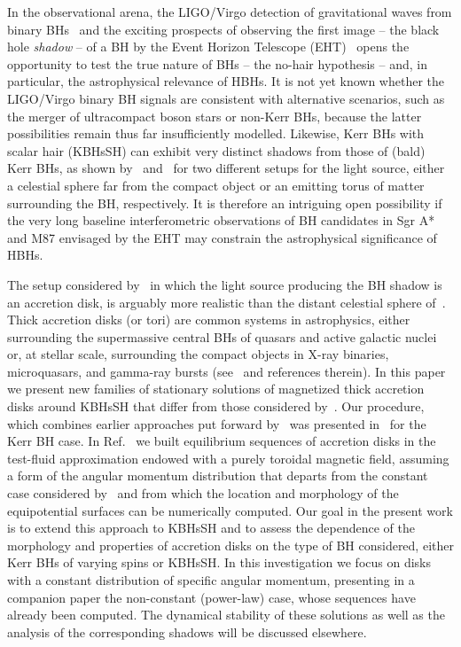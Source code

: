 \documentclass[twocolumn,aps,showpacs,showkeys,prd,superscriptaddress,byrevtex, amsmath]{revtex4-1}
\begin{document}
In the observational arena, the LIGO/Virgo detection of gravitational waves from binary BHs~\cite{Abbott2016, Abbott:2016nmj, Abbott:2017vtc, Abbott:2017oio, Abbott:2017gyy} and the exciting prospects of observing the first image -- the black hole {\it shadow} -- of a BH by the Event Horizon Telescope (EHT)~\cite{Fish:2016} opens the opportunity to test the true nature of BHs -- the no-hair hypothesis -- and, in particular, the astrophysical relevance of HBHs. It is not yet known whether the LIGO/Virgo binary BH signals are consistent with alternative scenarios, such as the merger of ultracompact boson stars or non-Kerr BHs, because the latter possibilities remain thus far insufficiently modelled. Likewise, Kerr BHs with scalar hair (KBHsSH) can exhibit very distinct shadows from those of (bald) Kerr BHs, as shown by~\cite{Cunha:2015} and~\cite{Vincent:2016} for two different setups for the light source, either a celestial sphere far from the compact object or an emitting torus of matter surrounding the BH, respectively. It is therefore an intriguing open possibility if the very long baseline interferometric observations of BH candidates in Sgr A* and M87 envisaged by the EHT may constrain the astrophysical significance of HBHs.

The setup considered by~\cite{Vincent:2016} in which the light source producing the BH shadow is an accretion disk, is arguably more realistic than the distant celestial sphere of~\cite{Cunha:2015}. Thick accretion disks (or tori) are common systems in astrophysics, either surrounding the supermassive central BHs of quasars and active galactic nuclei or, at  stellar scale, surrounding the compact objects in X-ray binaries, microquasars, and gamma-ray bursts (see~\cite{Abramowicz:2013} and references therein). In this paper we present new families of stationary solutions of magnetized thick accretion disks around KBHsSH that differ from those considered by~\cite{Vincent:2016}. Our procedure, which combines earlier approaches  put forward by~\cite{Komissarov:2006,Qian:2009} was presented in~\cite{Gimeno-Soler:2017} for the Kerr BH case. In Ref.~\cite{Gimeno-Soler:2017} we built equilibrium sequences of accretion disks  in the test-fluid approximation endowed with a purely toroidal magnetic field, assuming a form of the angular momentum distribution that departs from the constant case considered by~\cite{Komissarov:2006} and from which the location and morphology of the equipotential surfaces can be numerically computed. Our goal in the present work is to extend this approach to KBHsSH and to assess the dependence of the morphology and properties of accretion disks on the type of BH considered, either Kerr BHs of varying spins or KBHsSH. In this investigation we focus on disks with a constant distribution of specific angular momentum, presenting in a companion paper the non-constant (power-law) case, whose sequences have already been computed. The dynamical stability of these solutions as well as the analysis of the corresponding shadows will be discussed elsewhere.
\end{document}
